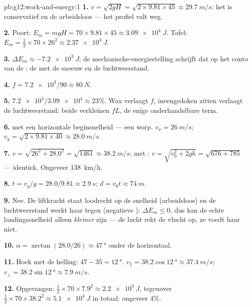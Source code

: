 \begin{solution}{pb:g12:work-and-energy:1}
\textbf{1.} $v = \sqrt{2gH} = \sqrt{2 \times 9.81 \times 45} \approx
\qty{29.7}{m/s}$: het  is conservatief en de 
arbeidsloos --- het profiel valt weg.

\textbf{2.} Poort: $E_m = mgH = 70 \times 9.81 \times 45 \approx
\qty{3.09e4}{J}$. Tafel: $E_m = \tfrac12 \times 70 \times 26^2
\approx \qty{2.37e4}{J}$.

\textbf{3.} $\Delta E_m \approx \qty{-7.2e3}{J}$; de
mechanische-energiestelling schrijft dat op het conto van de
: de  met de sneeuw en de luchtweerstand.

\textbf{4.} $f = \num{7.2e3}/90 \approx \qty{80}{N}$.

\textbf{5.} $\num{7.2e3}/\num{3.09e4} \approx 23\%$. Wax verlaagt $f$,
ineengedoken zitten verlaagt de luchtweerstand: beide verkleinen $fL$, de enige
onderhandelbare term.

\textbf{6.}  met een horizontale beginsnelheid --- een worp.
$v_x = \qty{26}{m/s}$; $v_y = \sqrt{2 \times 9.81 \times 40} \approx
\qty{28.0}{m/s}$.

\textbf{7.} $v = \sqrt{26^2 + 28.0^2} = \sqrt{1461} \approx
\qty{38.2}{m/s}$; met : $v = \sqrt{v_0^2 + 2gh} = \sqrt{676 + 785}$
--- identiek. Ongeveer \qty{138}{km/h}.

\textbf{8.} $t = v_y/g = 28.0/9.81 \approx \qty{2.9}{s}$;
$d = v_0 t \approx \qty{74}{m}$.

\textbf{9.} Nee. De liftkracht staat loodrecht op de snelheid (arbeidsloos) en
de luchtweerstand werkt haar tegen (negatieve ): $\Delta E_m \leq 0$, dus kan
de echte landingssnelheid alleen \emph{kleiner} zijn --- de lucht rekt de
vlucht op, ze voedt haar niet.

\textbf{10.} $\alpha = \arctan(28.0/26) \approx \qty{47}{\degree}$ onder de
horizontaal.

\textbf{11.} Hoek met de helling: $47 - 35 = \qty{12}{\degree}$.
$v_\parallel = 38.2\cos\qty{12}{\degree} \approx \qty{37.4}{m/s}$;
$v_\perp = 38.2\sin\qty{12}{\degree} \approx \qty{7.9}{m/s}$.

\textbf{12.} Opgevangen: $\tfrac12 \times 70 \times 7.9^2 \approx
\qty{2.2e3}{J}$, tegenover $\tfrac12 \times 70 \times 38.2^2 \approx
\qty{5.1e4}{J}$ in totaal: ongeveer $4\%$.


\end{solution}
